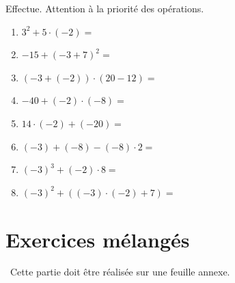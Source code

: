 \documentclass[../../syllabus_1.tex]{subfiles}
\begin{document}
\begin{exercise}
    Effectue. Attention à la priorité des opérations.
    \begin{enumerate}[cols=2, itemsep=4cm]
        \item \(3^{2} + 5 \cdot ( - 2) =\)
        \item \(- 15 + ( - 3 + 7)^{2} =\)
        \item \(\left( - 3 + ( - 2) \right) \cdot (20 - 12) =\)
        \item \(- 40 + ( - 2) \cdot ( - 8) =\)
        \item \(14 \cdot ( - 2) + ( - 20) =\)
        \item \(( - 3) + ( - 8) - ( - 8) \cdot 2 =\)
        \item \(( - 3)^{3} + ( - 2) \cdot 8 =\)
        \item \(( - 3)^{2} + \left( ( - 3) \cdot ( - 2) + 7 \right) =\)
    \end{enumerate}
\end{exercise}

\newpage
\section{Exercices mélangés}
~Cette partie doit être réalisée sur une feuille annexe.
\setcounter{exercise}{0}
\end{document}
